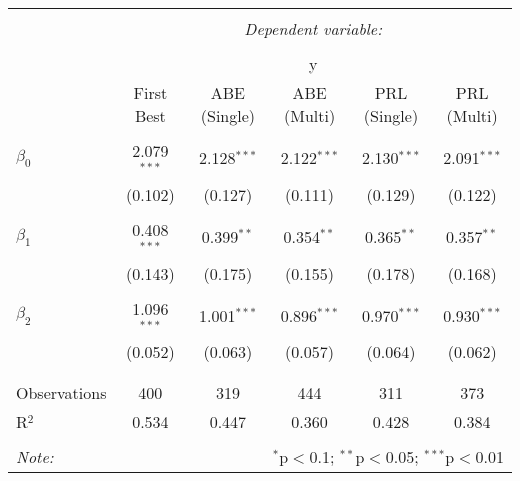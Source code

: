 
\begin{tabular}{@{\extracolsep{5pt}}lccccc} 
\\[-1.8ex]\hline 
\hline \\[-1.8ex] 
 & \multicolumn{5}{c}{\textit{Dependent variable:}} \\ 
\cline{2-6} 
\\[-1.8ex] & \multicolumn{5}{c}{y} \\ 
 & First Best & ABE (Single) & ABE (Multi) & PRL (Single) & PRL (Multi) \\ 
\hline \\[-1.8ex] 
 $\beta_0$ & 2.079$^{***}$ & 2.128$^{***}$ & 2.122$^{***}$ & 2.130$^{***}$ & 2.091$^{***}$ \\ 
  & (0.102) & (0.127) & (0.111) & (0.129) & (0.122) \\ 
  & & & & & \\ 
 $\beta_1$ & 0.408$^{***}$ & 0.399$^{**}$ & 0.354$^{**}$ & 0.365$^{**}$ & 0.357$^{**}$ \\ 
  & (0.143) & (0.175) & (0.155) & (0.178) & (0.168) \\ 
  & & & & & \\ 
 $\beta_2$ & 1.096$^{***}$ & 1.001$^{***}$ & 0.896$^{***}$ & 0.970$^{***}$ & 0.930$^{***}$ \\ 
  & (0.052) & (0.063) & (0.057) & (0.064) & (0.062) \\ 
  & & & & & \\ 
\hline \\[-1.8ex] 
Observations & 400 & 319 & 444 & 311 & 373 \\ 
R$^{2}$ & 0.534 & 0.447 & 0.360 & 0.428 & 0.384 \\ 
\hline 
\hline \\[-1.8ex] 
\textit{Note:}  & \multicolumn{5}{r}{$^{*}$p$<$0.1; $^{**}$p$<$0.05; $^{***}$p$<$0.01} \\ 
\end{tabular} 
